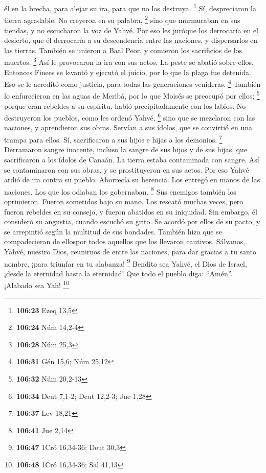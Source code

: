 \begin{paracol}{2}
él en la brecha, para alejar su ira, para que no los destruya.
\footnote{\textbf{106:23} Ezeq 13,5}  Sí, despreciaron la
tierra agradable. No creyeron en su palabra, \footnote{\textbf{106:24}
  Núm 14,2-4}  sino que murmuraban en sus tiendas, y no
escucharon la voz de Yahvé.  Por eso les juróque los
derrocaría en el desierto,  que él derrocaría a su
descendencia entre las naciones, y dispersarlos en las tierras.
 También se unieron a Baal Peor, y comieron los
sacrificios de los muertos. \footnote{\textbf{106:28} Núm 25,3}
 Así le provocaron la ira con sus actos. La peste se
abatió sobre ellos.  Entonces Finees se levantó y ejecutó
el juicio, por lo que la plaga fue detenida.  Eso se le
acreditó como justicia, para todas las generaciones venideras.
\footnote{\textbf{106:31} Gén 15,6; Núm 25,12}  También
lo enfurecieron en las aguas de Meribá, por lo que Moisés se preocupó
por ellos; \footnote{\textbf{106:32} Núm 20,2-13}  porque
eran rebeldes a su espíritu, habló precipitadamente con los labios.
 No destruyeron los pueblos, como les ordenó Yahvé,
\footnote{\textbf{106:34} Deut 7,1-2; Deut 12,2-3; Jue 1,28}
 sino que se mezclaron con las naciones, y aprendieron
sus obras.  Servían a sus ídolos, que se convirtió en una
trampa para ellos.  Sí, sacrificaron a sus hijos e hijas
a los demonios. \footnote{\textbf{106:37} Lev 18,21} 
Derramaron sangre inocente, incluso la sangre de sus hijos y de sus
hijas, que sacrificaron a los ídolos de Canaán. La tierra estaba
contaminada con sangre.  Así se contaminaron con sus
obras, y se prostituyeron en sus actos.  Por eso Yahvé
ardió de ira contra su pueblo. Aborrecía su herencia. 
Los entregó en manos de las naciones. Los que los odiaban los
gobernaban. \footnote{\textbf{106:41} Jue 2,14}  Sus
enemigos también los oprimieron. Fueron sometidos bajo su mano.
 Los rescató muchas veces, pero fueron rebeldes en su
consejo, y fueron abatidos en su iniquidad.  Sin embargo,
él consideró su angustia, cuando escuchó su grito.  Se
acordó por ellos de su pacto, y se arrepintió según la multitud de sus
bondades.  También hizo que se compadecieran de ellospor
todos aquellos que los llevaron cautivos.  Sálvanos,
Yahvé, nuestro Dios, reunirnos de entre las naciones, para dar gracias a
tu santo nombre, ¡para triunfar en tu alabanza! \footnote{\textbf{106:47}
  1Cró 16,34-36; Deut 30,3}  Bendito sea Yahvé, el Dios
de Israel, ¡desde la eternidad hasta la eternidad! Que todo el pueblo
diga: ``Amén''. ¡Alabado sea Yah! \footnote{\textbf{106:48} 1Cró
  16,34-36; Sal 41,13}


\end{paracol}
